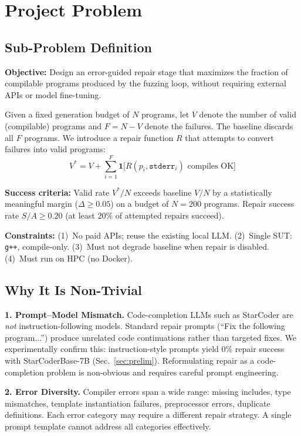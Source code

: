 \documentclass[conference]{IEEEtran}
\begin{document}
\section{Project Problem}

\subsection{Sub-Problem Definition}

\textbf{Objective:} Design an error-guided repair stage that maximizes the fraction of compilable programs produced by the fuzzing loop, without requiring external APIs or model fine-tuning.

Given a fixed generation budget of $N$ programs, let $V$ denote the number of valid (compilable) programs and $F = N - V$ denote the failures. The baseline discards all $F$ programs. We introduce a repair function $R$ that attempts to convert failures into valid programs:
\[
V^{*} = V + \sum_{i=1}^{F} \mathbf{1}\big[R(p_i, \texttt{stderr}_i) \text{ compiles OK}\big]
\]

\textbf{Success criteria:} Valid rate $V^*/N$ exceeds baseline $V/N$ by a statistically meaningful margin ($\Delta \geq 0.05$) on a budget of $N = 200$ programs. Repair success rate $S/A \geq 0.20$ (at least 20\% of attempted repairs succeed).

\textbf{Constraints:} (1)~No paid APIs; reuse the existing local LLM. (2)~Single SUT: \texttt{g++}, compile-only. (3)~Must not degrade baseline when repair is disabled. (4)~Must run on HPC (no Docker).

\subsection{Why It Is Non-Trivial}

\textbf{1. Prompt--Model Mismatch.} Code-completion LLMs such as StarCoder are \emph{not} instruction-following models. Standard repair prompts (``Fix the following program...'') produce unrelated code continuations rather than targeted fixes. We experimentally confirm this: instruction-style prompts yield 0\% repair success with StarCoderBase-7B (Sec.~\ref{sec:prelim}). Reformulating repair as a code-completion problem is non-obvious and requires careful prompt engineering.

\textbf{2. Error Diversity.} Compiler errors span a wide range: missing includes, type mismatches, template instantiation failures, preprocessor errors, duplicate definitions. Each error category may require a different repair strategy. A single prompt template cannot address all categories effectively.
\end{document}
